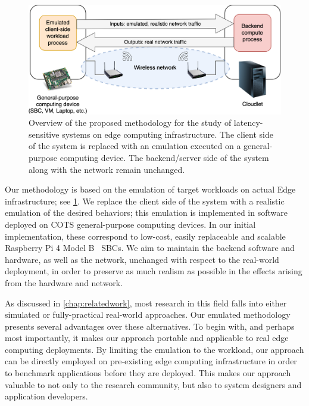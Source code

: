 \begin{figure}
    \centering
    \includegraphics[width=.8\textwidth]{Figs/methodology}
    \caption{%
        Overview of the proposed methodology for the study of latency-sensitive systems on edge computing infrastructure.
        The  client side of the system is replaced with an emulation executed on a general-purpose computing device.
        The backend/server side of the system along with the network remain unchanged.
    }\label{fig:methodology}
\end{figure}

Our methodology is based on the emulation of target workloads on actual Edge infrastructure;
see \cref{fig:methodology}.
We replace the client side of the system with a realistic emulation of the desired behaviors;
this emulation is implemented in software deployed on \gls{COTS} general-purpose computing devices.
In our initial implementation, these correspond to low-cost, easily replaceable and scalable Raspberry Pi 4 Model B~\cite{raspberrypi} \glspl{SBC}.
We aim to maintain the backend software and hardware, as well as the network, unchanged with respect to the real-world deployment, in order to preserve as much realism as possible in the effects arising from the hardware and network.

As discussed in \cref{chap:relatedwork}, most research in this field falls into either simulated or fully-practical real-world approaches.
Our emulated methodology presents several advantages over these alternatives.
To begin with, and perhaps most importantly, it makes our approach portable and applicable to real edge computing deployments.
By limiting the emulation to the workload, our approach can be directly employed on pre-existing edge computing infrastructure in order to benchmark applications before they are deployed.
This makes our approach valuable to not only to the research community, but also to system designers and application developers.


